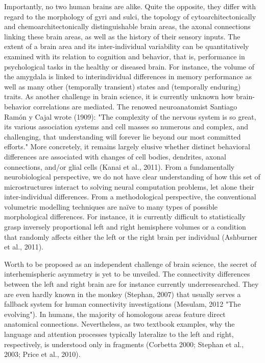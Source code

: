 \documentclass[authoryear,review,3p]{elsarticle}
\begin{document}
Importantly,
no two human brains are alike.
Quite the opposite,
they differ with regard to
the morphology of gyri and sulci,
the topology of cytoarchitectonically and chemoarchitectonically
distinguishable brain areas,
the axonal connections linking these brain areas,
as well as the history of their sensory inputs.
%
The extent of a brain area and its inter-individual variability
can be quantitatively examined with its relation to cognition and behavior,
that is,
performance in psychological tasks in the healthy or diseased brain.
For instance, the volume of the amygdala is linked to
interindividual differences in memory performance as well as
many other (temporally transient) states and
(temporally enduring) traits.
%
As another challenge in brain science,
it is currently unknown how
brain-behavior correlations are mediated.
%
The renowed neuroanatomist Santiago Ram\'{o}n y Cajal wrote (1909):
"The complexity of the nervous system is so great,
its various association systems and cell masses so numerous and
complex, and challenging,
that understanding will forever lie beyond our most committed efforts."
%
More concretely, it remains largely elusive whether distinct behavioral differences
are associated with changes of
cell bodies, dendrites, axonal connections, and/or glial cells
(Kanai et al., 2011).
%
From a fundamentally neurobiological perspective,
we do not have clear understanding of how
this set of microstructures interact to
solving neural computation problems,
let alone their inter-individual differences.
From a methodological perspective,
the conventional volumetric modelling techniques are na\"ive to
many types of possible morphological differences.
For instance,
it is currently difficult to statistically grasp
inversely proportional left and right hemisphere volumes
or
a condition that randomly affects either the left or the right brain
per individual
(Ashburner et al., 2011).


Worth to be proposed as an independent challenge of
brain science, the secret of interhemispheric
asymmetry is yet to be unveiled.
The connectivity differences between the left and right brain are
for instance currently underresearched.
They are even hardly known in the monkey (Stephan, 2007)
that usually serves a fallback system for human
connectivity investigations (Mesulam, 2012 "The evolving").
In humans, the majority of homologous areas feature
direct anatomical connections.
Nevertheless, as two textbook examples,
why the language and attention processes typically lateralize to
the left and right, respectively,
is understood only in fragments
(Corbetta 2000; Stephan et al., 2003; Price et al., 2010).
\end{document}
